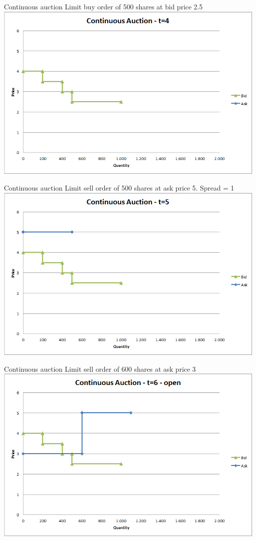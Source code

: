 \documentclass[english,10pt
,aspectratio=169
]{beamer}
\begin{document}
\begin{frame}{Continuous auction}
	Limit buy order of 500 shares at bid price 2.5
	\quad
	\center
	\includegraphics[width=.75\linewidth]{pics/Continuous_t4}
\end{frame}


\begin{frame}{Continuous auction}
	Limit sell order of 500 shares at ask price 5. Spread =  1
	\quad
	\center
	\includegraphics[width=.75\linewidth]{pics/Continuous_t5}
\end{frame}


\begin{frame}{Continuous auction}
	Limit sell order of 600 shares at ask price 3
	\quad
	\center
	\includegraphics[width=.75\linewidth]{pics/Continuous_t6open}
\end{frame}
\end{document}
